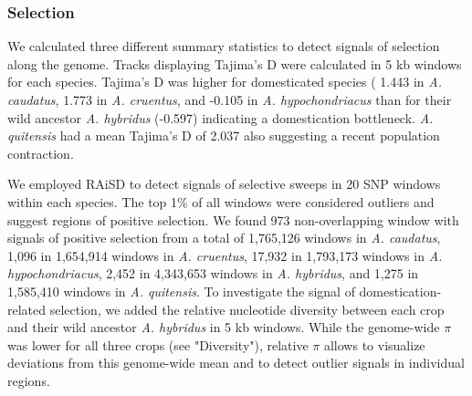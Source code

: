 \documentclass[9pt,twocolumn,twoside]{celabRxiv}
\begin{document}


 
 

 


\subsubsection{Selection} 
We calculated three different summary statistics to detect signals of selection along the genome. 
Tracks displaying Tajima's D were calculated in 5 kb windows for each species. 
Tajima's D was higher for domesticated species ( 1.443 in \textit{A. caudatus}, 1.773 in \textit{A. cruentus}, and -0.105 in \textit{A. hypochondriacus} than for their wild ancestor \textit{A. hybridus} (-0.597) indicating a domestication bottleneck. \textit{A. quitensis} had a mean Tajima's D of 2.037 also suggesting a recent population contraction.


% 

We employed RAiSD to detect signals of selective sweeps in 20 SNP windows within each species. 
The top 1\% of all windows were considered outliers and suggest regions of positive selection.
We found 973 non-overlapping window with signals of positive selection from a total of 1,765,126 windows in \textit{A. caudatus}, 1,096 in 1,654,914 windows in \textit{A. cruentus}, 17,932 in 1,793,173 windows in \textit{A. hypochondriacus}, 2,452 in 4,343,653 windows  in \textit{A. hybridus}, and 1,275 in 1,585,410 windows in \textit{A. quitensis}. 
To investigate the signal of domestication-related selection, we added the relative nucleotide diversity between each crop and their wild ancestor \textit{A. hybridus} in 5 kb windows. 
While the genome-wide $\pi$ was lower for all three crops (see "Diversity"), relative $\pi$ allows to visualize deviations from this genome-wide mean and to detect outlier signals in individual regions.
\end{document}
